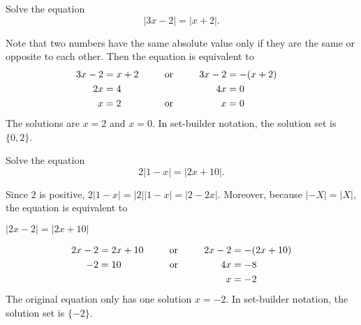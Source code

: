 
	\begin{multicols}{2}

		\begin{example}\label{abs=abs}
			Solve the equation
			\[|3x-2|=|x+2|.\]
		\end{example}
		\vspace{-0.5\baselineskip}
		\begin{solution}Note that two numbers have the same absolute value only if they are the same or opposite to each other. Then the equation is equivalent to %
				\begin{alignat*}{3}
					3x-2 & =x+2 &  & \ctc{or} & 3x-2 & =-(x+2) \\
					2x   & =4   &  &          & 4x   & =0      \\
					x    & =2   &  & \ctc{or} & x    & =0
				\end{alignat*}
			The solutions are $x=2$ and $x=0$. In set-builder notation, the solution set is $\{0, 2\}$.
		\end{solution}

		\columnbreak


		\begin{example}
			Solve the equation
			\[2|1-x|=|2x+10|.\]
		\end{example}
		\vspace{-0.5\baselineskip}
		\begin{solution}
			Since $2$ is positive, $2|1-x|=|2||1-x|=|2-2x|$. Moreover, because $|-X|=|X|$, the equation is equivalent to \\ 
			\centerline{$|2x-2|=|2x+10|$}
				\begin{alignat*}{3}
					2x-2 & =2x+10 &  & \ctc{or} & 2x-2 & =-(2x+10) \\
					-2   & =10    &  & \ctc{or} & 4x   & =-8       \\
					     &        &  &          & x    & =-2
				\end{alignat*}
			The original equation only has one solution $x=-2$. In set-builder notation, the solution set is $\{-2\}$.
		\end{solution}
	\end{multicols}

